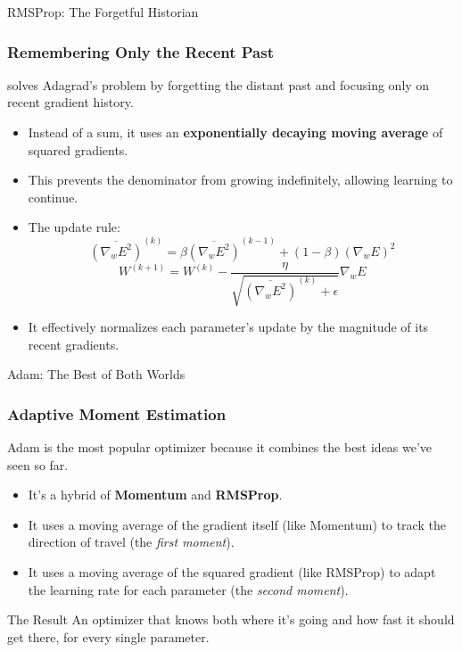 \begin{frame}{RMSProp: The Forgetful Historian}
    \frametitle{Remembering Only the Recent Past}
     solves Adagrad's problem by forgetting the distant past and focusing only on recent gradient history.
    \begin{itemize}
        \item Instead of a sum, it uses an \textbf{exponentially decaying moving average} of squared gradients.
        \item This prevents the denominator from growing indefinitely, allowing learning to continue.
        \item The update rule:
            $$ \overline{(\nabla_w E^2)}^{(k)} = \beta \overline{(\nabla_w E^2)}^{(k-1)} + (1-\beta)(\nabla_w E)^2 $$
            $$ W^{(k+1)} = W^{(k)} - \frac{\eta}{\sqrt{\overline{(\nabla_w E^2)}^{(k)} + \epsilon}} \nabla_w E $$
        \item It effectively normalizes each parameter's update by the magnitude of its recent gradients.
    \end{itemize}
\end{frame}

\begin{frame}{Adam: The Best of Both Worlds}
    \frametitle{Adaptive Moment Estimation}
    Adam is the most popular optimizer because it combines the best ideas we've seen so far.
    \begin{itemize}
        \item It's a hybrid of \textbf{Momentum} and \textbf{RMSProp}.
        \item It uses a moving average of the gradient itself (like Momentum) to track the direction of travel (the \textit{first moment}).
        \item It uses a moving average of the squared gradient (like RMSProp) to adapt the learning rate for each parameter (the \textit{second moment}).
    \end{itemize}
    \begin{alertblock}{The Result}
        An optimizer that knows both where it's going and how fast it should get there, for every single parameter.
    \end{alertblock}
\end{frame}

